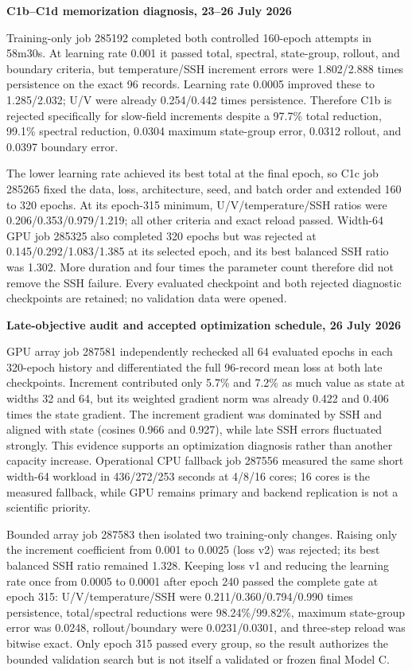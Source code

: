 \documentclass[11pt]{article}
\newenvironment{examplebox}[1]
  {\begin{center}\begin{lrbox}{\examplestore}\begin{minipage}{0.92\textwidth}%
   \textbf{#1}\par\smallskip}
  {\end{minipage}\end{lrbox}\setlength{\fboxsep}{8pt}%
   \fcolorbox{blue}{lightblue}{\usebox{\examplestore}}\end{center}}
\begin{document}
\begin{examplebox}{C1b--C1d memorization diagnosis, 23--26 July 2026}
Training-only job 285192 completed both controlled 160-epoch attempts in 58m30s.
At learning rate 0.001 it passed total, spectral, state-group, rollout, and boundary
criteria, but temperature/SSH increment errors were 1.802/2.888 times persistence on
the exact 96 records.  Learning rate 0.0005 improved these to 1.285/2.032; U/V were
already 0.254/0.442 times persistence.  Therefore C1b is rejected specifically for
slow-field increments despite a 97.7\% total reduction, 99.1\% spectral reduction,
0.0304 maximum state-group error, 0.0312 rollout, and 0.0397 boundary error.

The lower learning rate achieved its best total at the final epoch, so C1c job 285265
fixed the data, loss, architecture, seed, and batch order and extended 160 to 320
epochs.  At its epoch-315 minimum, U/V/temperature/SSH ratios were
0.206/0.353/0.979/1.219; all other criteria and exact reload passed.  Width-64 GPU job
285325 also completed 320 epochs but was rejected at 0.145/0.292/1.083/1.385 at its
selected epoch, and its best balanced SSH ratio was 1.302.  More duration and four
times the parameter count therefore did not remove the SSH failure.  Every evaluated
checkpoint and both rejected diagnostic checkpoints are retained; no validation data
were opened.
\end{examplebox}

\begin{examplebox}{Late-objective audit and accepted optimization schedule, 26 July 2026}
GPU array job 287581 independently rechecked all 64 evaluated epochs in each 320-epoch
history and differentiated the full 96-record mean loss at both late checkpoints.
Increment contributed only 5.7\% and 7.2\% as much value as state at widths 32 and 64,
but its weighted gradient norm was already 0.422 and 0.406 times the state gradient.
The increment gradient was dominated by SSH and aligned with state (cosines 0.966 and
0.927), while late SSH errors fluctuated strongly.  This evidence supports an
optimization diagnosis rather than another capacity increase.  Operational CPU
fallback job 287556 measured the same short width-64 workload in 436/272/253 seconds
at 4/8/16 cores; 16 cores is the measured fallback, while GPU remains primary and
backend replication is not a scientific priority.

Bounded array job 287583 then isolated two training-only changes.  Raising only the
increment coefficient from 0.001 to 0.0025 (loss v2) was rejected; its best balanced
SSH ratio remained 1.328.  Keeping loss v1 and reducing the learning rate once from
0.0005 to 0.0001 after epoch 240 passed the complete gate at epoch 315:
U/V/temperature/SSH were 0.211/0.360/0.794/0.990 times persistence, total/spectral
reductions were 98.24\%/99.82\%, maximum state-group error was 0.0248,
rollout/boundary were 0.0231/0.0301, and three-step reload was bitwise exact.
Only epoch 315 passed every group, so the result authorizes the bounded validation
search but is not itself a validated or frozen final Model C.
\end{examplebox}
\end{document}
